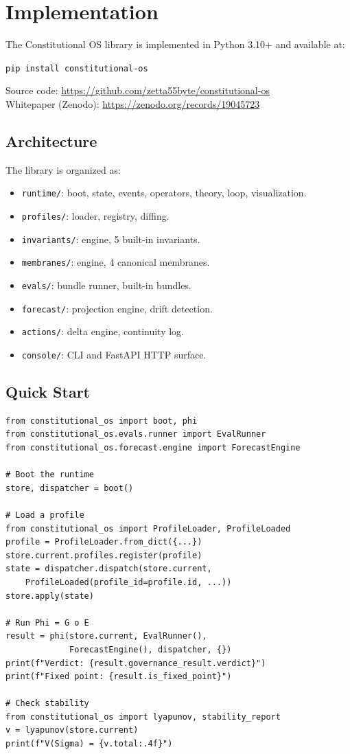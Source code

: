 \documentclass[11pt]{article}
\begin{document}
\section{Implementation}
\label{sec:implementation}

The Constitutional OS library is implemented in Python 3.10+
and available at:
\begin{center}
\texttt{pip install constitutional-os}
\end{center}
Source code: \url{https://github.com/zetta55byte/constitutional-os}\\
Whitepaper (Zenodo): \url{https://zenodo.org/records/19045723}

\subsection{Architecture}

The library is organized as:
\begin{itemize}
  \item \texttt{runtime/}: boot, state, events, operators,
    theory, loop, visualization.
  \item \texttt{profiles/}: loader, registry, diffing.
  \item \texttt{invariants/}: engine, 5 built-in invariants.
  \item \texttt{membranes/}: engine, 4 canonical membranes.
  \item \texttt{evals/}: bundle runner, built-in bundles.
  \item \texttt{forecast/}: projection engine, drift detection.
  \item \texttt{actions/}: delta engine, continuity log.
  \item \texttt{console/}: CLI and FastAPI HTTP surface.
\end{itemize}

\subsection{Quick Start}

\begin{lstlisting}
from constitutional_os import boot, phi
from constitutional_os.evals.runner import EvalRunner
from constitutional_os.forecast.engine import ForecastEngine

# Boot the runtime
store, dispatcher = boot()

# Load a profile
from constitutional_os import ProfileLoader, ProfileLoaded
profile = ProfileLoader.from_dict({...})
store.current.profiles.register(profile)
state = dispatcher.dispatch(store.current,
    ProfileLoaded(profile_id=profile.id, ...))
store.apply(state)

# Run Phi = G o E
result = phi(store.current, EvalRunner(),
             ForecastEngine(), dispatcher, {})
print(f"Verdict: {result.governance_result.verdict}")
print(f"Fixed point: {result.is_fixed_point}")

# Check stability
from constitutional_os import lyapunov, stability_report
v = lyapunov(store.current)
print(f"V(Sigma) = {v.total:.4f}")
\end{lstlisting}
\end{document}
